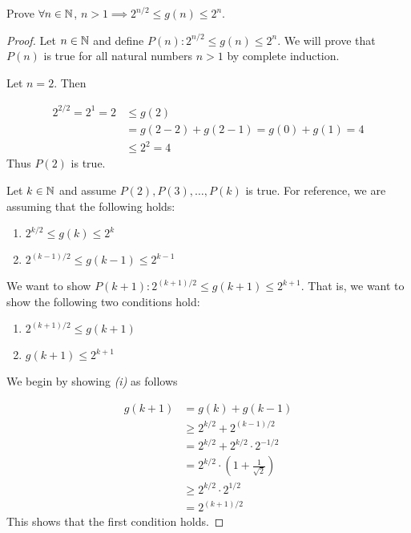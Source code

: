 \documentclass[12pt, a4paper]{amsart}
\theoremstyle{definition}
\theoremstyle{remark}
\numberwithin{Theorem}{section}
\begin{document}
Prove 
$\forall n \in \mathbb N$, $n > 1 \implies 2^{n/2} 
\leqslant g(n) \leqslant 2^{n}$.

\begin{proof}
    Let $n \in \mathbb N$ and define $P(n) : 2^{n/2} \leqslant g(n) \leqslant 2^{n}$.
    We will prove that $P(n)$ is true for all natural numbers $n > 1$
    by complete induction.
    
    \base
    
    Let $n = 2$. Then
    
    \begin{align*}
        2^{2/2} = 2^1 = 2 &\leqslant g(2) \\
        &= g(2 - 2) + g(2 - 1) = g(0) + g(1) = 4 \\
        &\leqslant 2^2 = 4
    \end{align*}
    Thus $P(2)$ is true.
    
    \istep
    
    Let $k \in \mathbb N$ and assume $P(2), P(3), \dots, P(k)$ is true.
    For reference, we are assuming that the following holds:
    
    \begin{enumerate}
        \item $2^{k/2} \leqslant g(k) \leqslant 2^{k}$
        \item $2^{(k - 1)/2} \leqslant g(k - 1) \leqslant 2^{k-1}$
    \end{enumerate}
    
    We want
    to show $P(k + 1) : 2^{(k+1)/2} \leqslant g(k + 1) \leqslant 2^{k+1}$.
    That is, we want to show the following two conditions hold:
    
    \begin{enumerate}[label=\roman*), font=\itshape]
        \item $2^{(k + 1)/2} \leqslant g(k + 1)$
        \item $g(k + 1) \leqslant 2^{k + 1}$
    \end{enumerate}
    
    We begin by showing \emph{(i)} as follows
    
    \begin{align*}
        g(k + 1) &= g(k) + g(k - 1) \\
        &\geqslant 2^{k/2} + 2^{(k-1)/2} \tag{by (1) and (2)} \\
        &= 2^{k/2} + 2^{k/2} \cdot 2^{-1/2} \\
        &= 2^{k/2} \cdot (1 + \frac{1}{\sqrt{2}}) \\
        &\geqslant 2^{k/2} \cdot 2^{1/2} \tag{by calculator} \\
        &= 2^{(k+1)/2}
    \end{align*}
    This shows that the first condition holds.
    

\end{proof}
\end{document}
